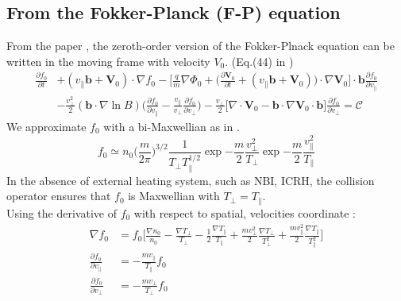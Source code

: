 \subsection{From the Fokker-Planck (F-P) equation}
From the paper \citep{Hinton85}, the zeroth-order version of the Fokker-Plnack equation can be written in the moving frame with velocity $V_0$. (Eq.(44) in \citep{Hinton85})
\begin{equation}
\begin{split}
    \frac{\partial f_0}{\partial t} &+ (v_\parallel \bm{b}+\bm{V}_0) \cdot \nabla f_0-\Bigg[\frac{q}{m}\nabla\Phi_0 + \Big(\frac{\partial \bm{V}_0}{\partial t} + (v_\parallel \bm{b} + \bm{V}_0)\Big)\cdot \nabla \bm{V}_0 \Bigg] \cdot \bm{b} \frac{\partial f_0}{\partial v_\parallel} \\
    & -\frac{v_\perp^2}{2}(\bm{b} \cdot \nabla \ln{B}) \Big(\frac{\partial f_0}{\partial v_\parallel} - \frac{v_\parallel}{v_\perp} \frac{\partial f_0}{\partial v_\perp}\Big) - \frac{v_\perp}{2}\big[\nabla \cdot \bm{V}_0 - \bm{b} \cdot \nabla \bm{V}_0 \cdot \bm{b}\big]\frac{\partial f_0}{\partial v_\perp} = \mathcal{C} 
\label{FP_equation}
\end{split}
\end{equation}
We approximate $f_0$ with a bi-Maxwellian as in \citep{Choe95}.
\begin{equation}
    f_0 \simeq n_0 \Big(\frac{m}{2\pi}\Big)^{3/2} \frac{1}{T_\perp T_\parallel^{1/2}}\exp{-\frac{m}{2}\frac{v_\perp^2}{T_\perp}}\exp{-\frac{m}{2}\frac{v_\parallel^2}{T_\parallel}}
\end{equation}
In the absence of external heating system, such as NBI, ICRH, the collision operator ensures that $f_0$ is Maxwellian with $T_\perp = T_\parallel$. \\
Using the derivative of $f_0$ with respect to spatial, velocities coordinate : 
\begin{equation}
\begin{split}
    \nabla f_0 &= f_0 \Big [ \frac{\nabla n_0}{n_0} - \frac{\nabla T_\perp}{T_\perp} - \frac{1}{2}\frac{\nabla T_\parallel}{T_\parallel} + \frac{mv_\perp^2}{2} \frac{\nabla T_\perp}{T_\perp^2} + \frac{m v_\parallel^2}{2} \frac{\nabla T_\parallel}{T_\parallel^2} \Big] \\
    \frac{\partial f_0}{\partial v_\parallel} &= -\frac{mv_\parallel}{T_\parallel}f_0 \\
    \frac{\partial f_0}{\partial v_\perp}&= -\frac{mv_\perp}{T_\perp}f_0
\end{split}
\end{equation}

